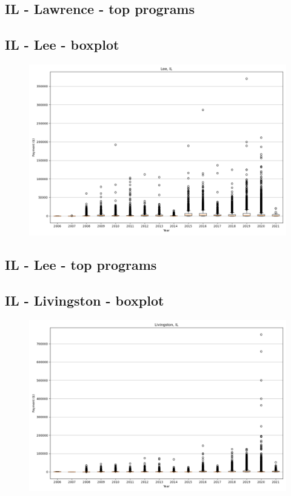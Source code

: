\subsection*{IL - Lawrence - top programs}

\newpage
\subsection*{IL - Lee - boxplot}
\begin{figure}[h]
\centering
\includegraphics[width=7in]{../output/boxplots/counties/Lee-IL_boxplot.png}
\end{figure}


\subsection*{IL - Lee - top programs}

\newpage
\subsection*{IL - Livingston - boxplot}
\begin{figure}[h]
\centering
\includegraphics[width=7in]{../output/boxplots/counties/Livingston-IL_boxplot.png}
\end{figure}


